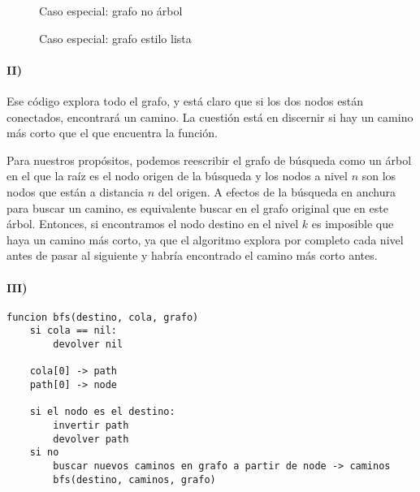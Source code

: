 \documentclass{aitemplate}
\begin{document}
\begin{figure}[hbtp]
\centering
{}
\caption{Caso especial: grafo no árbol}
\end{figure}

\begin{figure}[h]
\centering
{}
\caption{Caso especial: grafo estilo lista}
\end{figure}

\newpage

\paragraph{II)} Ese código explora todo el grafo, y está claro que si los dos nodos están conectados, encontrará un camino. La cuestión está en discernir si hay un camino más corto que el que encuentra la función.

Para nuestros propósitos, podemos reescribir el grafo de búsqueda como un árbol en el que la raíz es el nodo origen de la búsqueda y los nodos a nivel $n$ son los nodos que están a distancia $n$ del origen. A efectos de la búsqueda en anchura para buscar un camino, es equivalente buscar en el grafo original que en este árbol. Entonces, si encontramos el nodo destino en el nivel $k$ es imposible que haya un camino más corto, ya que el algoritmo explora por completo cada nivel antes de pasar al siguiente y habría encontrado el camino más corto antes.

\paragraph{III)}
\begin{lstlisting}
funcion bfs(destino, cola, grafo)
	si cola == nil:
		devolver nil
	
	cola[0] -> path
	path[0] -> node
	
	si el nodo es el destino:
		invertir path
		devolver path
	si no
		buscar nuevos caminos en grafo a partir de node -> caminos
		bfs(destino, caminos, grafo)	
\end{lstlisting}
\end{document}
